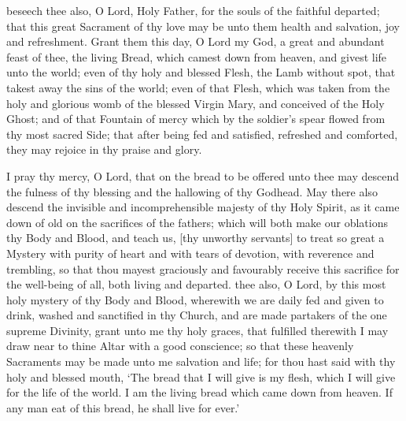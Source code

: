  beseech thee also, O Lord, Holy Father, for the souls of the faithful departed; that this great Sacrament of thy love may be unto them health and salvation, joy and refreshment. Grant them this day, O Lord my God, a great and abundant feast of thee, the living Bread, which camest down from heaven, and givest life unto the world; even of thy holy and blessed Flesh, the Lamb without spot, that takest away the sins of the world; even of that Flesh, which was taken from the holy and glorious womb of the blessed Virgin Mary, and conceived of the Holy Ghost; and of that Fountain of mercy which by the soldier's spear flowed from thy most sacred Side; that after being fed and satisfied, refreshed and comforted, they may rejoice in thy praise and glory.
\par
I pray thy mercy, O Lord, that on the bread to be offered unto thee may descend the fulness of thy blessing and the hallowing of thy Godhead. May there also descend the invisible and incomprehensible majesty of thy Holy Spirit, as it came down of old on the sacrifices of the fathers; which will both make our oblations thy Body and Blood, and teach us, [thy unworthy servants] to treat so great a Mystery with purity of heart and with tears of devotion, with reverence and trembling, so that thou mayest graciously and favourably receive this sacrifice for the well-being of all, both living and departed. 
 thee also, O Lord, by this most holy mystery of thy Body and Blood, wherewith we are daily fed and given to drink, washed and sanctified in thy Church, and are made partakers of the one supreme Divinity, grant unto me thy holy graces, that fulfilled therewith I may draw near to thine Altar with a good conscience; so that these heavenly Sacraments may be made unto me salvation and life; for thou hast said with thy holy and blessed mouth, `The bread that I will give is my flesh, which I will give for the life of the world. I am the living bread which came down from heaven. If any man eat of this bread, he shall live for ever.'
\par
